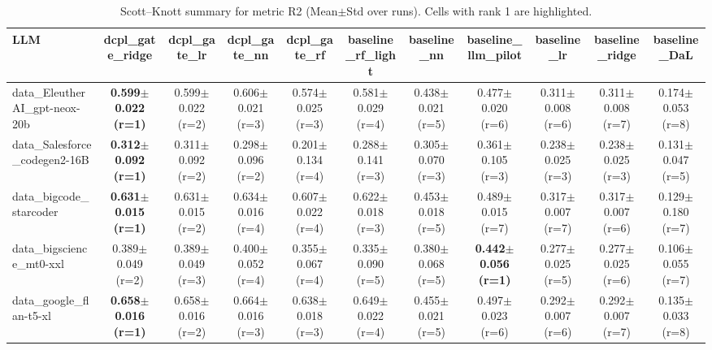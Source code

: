 \begin{table}[t]
\centering
\small
\caption{Scott--Knott summary for metric R2 (Mean$\pm$Std over runs). Cells with rank 1 are highlighted.}
\label{tab:sk_r2}
\setlength{\tabcolsep}{4pt}
\renewcommand{\arraystretch}{1.15}
\begin{tabular}{lcccccccccc}
\toprule
LLM & dcpl\_gate\_ridge & dcpl\_gate\_lr & dcpl\_gate\_nn & dcpl\_gate\_rf & baseline\_rf\_light & baseline\_nn & baseline\_llm\_pilot & baseline\_lr & baseline\_ridge & baseline\_DaL \\
\midrule
data\_EleutherAI\_gpt-neox-20b & \cellcolor{red!15}\textbf{0.599$\pm$0.022 {\scriptsize (r=1)}} & 0.599$\pm$0.022 {\scriptsize (r=2)} & 0.606$\pm$0.021 {\scriptsize (r=3)} & 0.574$\pm$0.025 {\scriptsize (r=3)} & 0.581$\pm$0.029 {\scriptsize (r=4)} & 0.438$\pm$0.021 {\scriptsize (r=5)} & 0.477$\pm$0.020 {\scriptsize (r=6)} & 0.311$\pm$0.008 {\scriptsize (r=6)} & 0.311$\pm$0.008 {\scriptsize (r=7)} & 0.174$\pm$0.053 {\scriptsize (r=8)} \\
data\_Salesforce\_codegen2-16B & \cellcolor{red!15}\textbf{0.312$\pm$0.092 {\scriptsize (r=1)}} & 0.311$\pm$0.092 {\scriptsize (r=2)} & 0.298$\pm$0.096 {\scriptsize (r=2)} & 0.201$\pm$0.134 {\scriptsize (r=4)} & 0.288$\pm$0.141 {\scriptsize (r=3)} & 0.305$\pm$0.070 {\scriptsize (r=3)} & 0.361$\pm$0.105 {\scriptsize (r=3)} & 0.238$\pm$0.025 {\scriptsize (r=3)} & 0.238$\pm$0.025 {\scriptsize (r=3)} & 0.131$\pm$0.047 {\scriptsize (r=5)} \\
data\_bigcode\_starcoder & \cellcolor{red!15}\textbf{0.631$\pm$0.015 {\scriptsize (r=1)}} & 0.631$\pm$0.015 {\scriptsize (r=2)} & 0.634$\pm$0.016 {\scriptsize (r=4)} & 0.607$\pm$0.022 {\scriptsize (r=4)} & 0.622$\pm$0.018 {\scriptsize (r=3)} & 0.453$\pm$0.018 {\scriptsize (r=5)} & 0.489$\pm$0.015 {\scriptsize (r=7)} & 0.317$\pm$0.007 {\scriptsize (r=7)} & 0.317$\pm$0.007 {\scriptsize (r=6)} & 0.129$\pm$0.180 {\scriptsize (r=7)} \\
data\_bigscience\_mt0-xxl & 0.389$\pm$0.049 {\scriptsize (r=2)} & 0.389$\pm$0.049 {\scriptsize (r=3)} & 0.400$\pm$0.052 {\scriptsize (r=4)} & 0.355$\pm$0.067 {\scriptsize (r=4)} & 0.335$\pm$0.090 {\scriptsize (r=5)} & 0.380$\pm$0.068 {\scriptsize (r=5)} & \cellcolor{red!15}\textbf{0.442$\pm$0.056 {\scriptsize (r=1)}} & 0.277$\pm$0.025 {\scriptsize (r=5)} & 0.277$\pm$0.025 {\scriptsize (r=6)} & 0.106$\pm$0.055 {\scriptsize (r=7)} \\
data\_google\_flan-t5-xl & \cellcolor{red!15}\textbf{0.658$\pm$0.016 {\scriptsize (r=1)}} & 0.658$\pm$0.016 {\scriptsize (r=2)} & 0.664$\pm$0.016 {\scriptsize (r=3)} & 0.638$\pm$0.018 {\scriptsize (r=3)} & 0.649$\pm$0.022 {\scriptsize (r=4)} & 0.455$\pm$0.021 {\scriptsize (r=5)} & 0.497$\pm$0.023 {\scriptsize (r=6)} & 0.292$\pm$0.007 {\scriptsize (r=6)} & 0.292$\pm$0.007 {\scriptsize (r=7)} & 0.135$\pm$0.033 {\scriptsize (r=8)} \\

\end{tabular}
\end{table}
